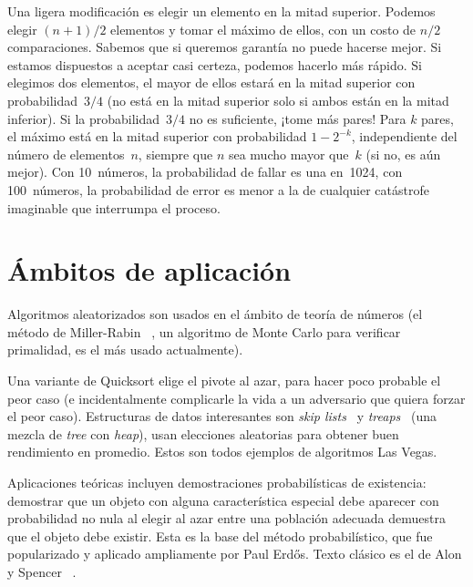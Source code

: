   Una ligera modificación es elegir un elemento en la mitad superior.
  Podemos elegir \((n + 1) / 2\) elementos y tomar el máximo de ellos,
  con un costo de \(n / 2\) comparaciones.
  Sabemos que si queremos garantía no puede hacerse mejor.
  Si estamos dispuestos a aceptar casi certeza,
  podemos hacerlo más rápido.
  Si elegimos dos elementos,
  el mayor de ellos estará en la mitad superior con probabilidad~\(3/4\)
  (no está en la mitad superior solo si ambos están en la mitad inferior).
  Si la probabilidad~\(3/4\) no es suficiente,
  ¡tome más pares!
  Para \(k\) pares,
  el máximo está en la mitad superior con probabilidad \(1 - 2^{-k}\),
  independiente del número de elementos~\(n\),
  siempre que \(n\) sea mucho mayor que~\(k\)
  (si no,
   es aún mejor).
  Con \num{10}~números,
  la probabilidad de fallar es una en~\num{1024},
  con \num{100}~números,
  la probabilidad de error es menor a la de cualquier catástrofe imaginable
  que interrumpa el proceso.

\section{Ámbitos de aplicación}
\label{sec:ambitos-aleatorizados}


  Algoritmos aleatorizados son usados en el ámbito de teoría de números
  (el método de Miller-Rabin~%
    \cite{miller76:_Riemann_hypot_tests_primality,
          rabin80:_probab_algor_test_primality},
   un algoritmo de Monte Carlo
   para verificar primalidad,
   es el más usado actualmente).

   Una variante de Quicksort
   elige el pivote al azar,
   para hacer poco probable el peor caso
   (e incidentalmente complicarle la vida a un adversario
    que quiera forzar el peor caso).
   Estructuras de datos interesantes son
   \emph{\foreignlanguage{english}{skip lists}}~%
     \cite{pugh90:_skip_lists}
   y \emph{\foreignlanguage{english}{treaps}}~%
     \cite{aragon89:_random_search_tree,
           seidel96:_random_search_trees}
   (una mezcla de \emph{\foreignlanguage{english}{tree}}
    con \emph{\foreignlanguage{english}{heap}}),
   usan elecciones aleatorias para obtener buen rendimiento en promedio.
   Estos son todos ejemplos de algoritmos Las Vegas.

   Aplicaciones teóricas incluyen demostraciones probabilísticas de existencia:
   demostrar que un objeto con alguna característica especial
   debe aparecer con probabilidad no nula
   al elegir al azar entre una población adecuada
   demuestra que el objeto debe existir.
   Esta es la base del método probabilístico,
   que fue popularizado y aplicado ampliamente por Paul Erdős.
   Texto clásico es el de Alon y Spencer~%
     \cite{alon15:_probabilistic_method}.

